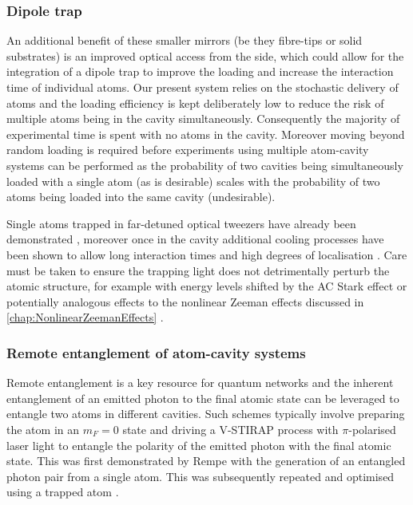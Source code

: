 \documentclass[../Thesis-IJspeert.tex]{subfiles}
\begin{document}
\subsubsection*{Dipole trap}

An additional benefit of these smaller mirrors (be they fibre-tips or solid substrates) is an improved optical access from the side, which could allow for the integration of a dipole trap to improve the loading and increase the interaction time of individual atoms.  Our present system relies on the stochastic delivery of atoms and the loading efficiency is kept deliberately low to reduce the risk of multiple atoms being in the cavity simultaneously.  Consequently the majority of experimental time is spent with no atoms in the cavity.  Moreover moving beyond random loading is required before experiments using multiple atom-cavity systems can be performed as the probability of two cavities being simultaneously loaded with a single atom (as is desirable) scales with the probability of two atoms being loaded into the same cavity (undesirable).

Single \Rb{} atoms trapped in far-detuned optical tweezers have already been demonstrated \cite{brandt09,brandt11,stuart14}, moreover once in the cavity additional cooling processes have been shown to allow long interaction times and high degrees of localisation \cite{maunz04, reiserer13}.  Care must be taken to ensure the trapping light does not detrimentally perturb the atomic structure, for example with energy levels shifted by the AC Stark effect or potentially analogous effects to the nonlinear Zeeman effects discussed in \cref{chap:NonlinearZeemanEffects} \cite{neuzner15}.

\subsubsection*{Remote entanglement of atom-cavity systems}

Remote entanglement is a key resource for quantum networks and the inherent entanglement of an emitted photon to the final atomic state can be leveraged to entangle two atoms in different cavities.  Such schemes typically involve preparing the atom in an $m_F=0$ state and driving a V-STIRAP process with $\pi$-polarised laser light to entangle the polarity of the emitted photon with the final atomic state.  This was first demonstrated by Rempe \etal{} \cite{wilk07b,wilk08} with the generation of an entangled photon pair from a single atom.  This was subsequently repeated and optimised using a trapped atom \cite{weber09,specht11}.
\end{document}
